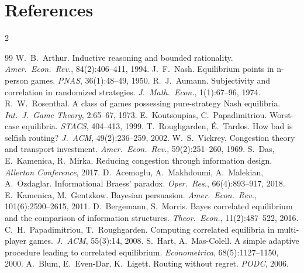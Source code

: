 \documentclass{article}
\begin{document}
\section*{References}\vspace{-13pt}
\setlength{\multicolsep}{2pt}\begin{multicols}{2}\let\origsection\section\renewcommand{\section}[2]{}%
\begin{thebibliography}{99}\scriptsize\setlength{\itemsep}{0pt}\setlength{\parsep}{0pt}\setlength{\parskip}{0pt}
 W.~B.~Arthur. Inductive reasoning and bounded rationality. \emph{Amer.\ Econ.\ Rev.}, 84(2):406--411, 1994.
 J.~F.~Nash. Equilibrium points in n-person games. \emph{PNAS}, 36(1):48--49, 1950.
 R.~J.~Aumann. Subjectivity and correlation in randomized strategies. \emph{J.\ Math.\ Econ.}, 1(1):67--96, 1974.
 R.~W.~Rosenthal. A class of games possessing pure-strategy Nash equilibria. \emph{Int.\ J.\ Game Theory}, 2:65--67, 1973.
 E.~Koutsoupias, C.~Papadimitriou. Worst-case equilibria. \emph{STACS}, 404--413, 1999.
 T.~Roughgarden, \'E.~Tardos. How bad is selfish routing? \emph{J.\ ACM}, 49(2):236--259, 2002.
 W.~S.~Vickrey. Congestion theory and transport investment. \emph{Amer.\ Econ.\ Rev.}, 59(2):251--260, 1969.
 S.~Das, E.~Kamenica, R.~Mirka. Reducing congestion through information design. \emph{Allerton Conference}, 2017.
 D.~Acemoglu, A.~Makhdoumi, A.~Malekian, A.~Ozdaglar. Informational Braess' paradox. \emph{Oper.\ Res.}, 66(4):893--917, 2018.
 E.~Kamenica, M.~Gentzkow. Bayesian persuasion. \emph{Amer.\ Econ.\ Rev.}, 101(6):2590--2615, 2011.
 D.~Bergemann, S.~Morris. Bayes correlated equilibrium and the comparison of information structures. \emph{Theor.\ Econ.}, 11(2):487--522, 2016.
 C.~H.~Papadimitriou, T.~Roughgarden. Computing correlated equilibria in multi-player games. \emph{J.\ ACM}, 55(3):14, 2008.
 S.~Hart, A.~Mas-Colell. A simple adaptive procedure leading to correlated equilibrium. \emph{Econometrica}, 68(5):1127--1150, 2000.
 A.~Blum, E.~Even-Dar, K.~Ligett. Routing without regret. \emph{PODC}, 2006.

\end{thebibliography}
\end{multicols}
\end{document}
